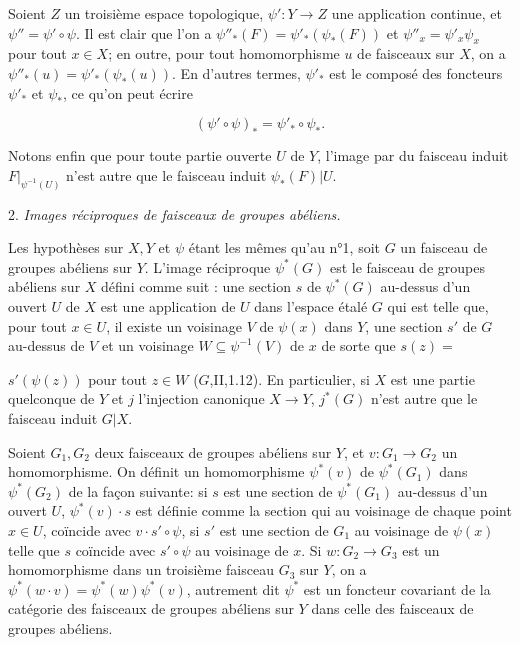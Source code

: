 Soient $Z$ un troisième espace topologique, $\psi' : Y \to Z$ une application continue, et $\psi'' = \psi' \circ \psi$. Il est clair que l'on a $\psi''_*(F) = \psi'_*(\psi_*(F))$ et $\psi''_x = \psi'_x \psi_x$ pour tout $x \in X$; en outre, pour tout homomorphisme $u$ de faisceaux sur $X$, on a $\psi''_*(u) = \psi'_*(\psi_*(u))$. En d'autres termes, $\psi'_*$ est le composé des foncteurs $\psi'_*$ et $\psi_*$, ce qu'on peut écrire

$$(\psi' \circ \psi)_* = \psi'_* \circ \psi_* .$$

Notons enfin que pour toute partie ouverte $U$ de $Y$, l'image par du faisceau induit $F|_{\psi^{-1}(U)}$ n'est autre que le faisceau induit $\psi_*(F)|U$.

2. \emph{Images réciproques de faisceaux de groupes abéliens.}

Les hypothèses sur $X, Y$ et $\psi$ étant les mêmes qu'au n°1, soit $G$ un faisceau de groupes abéliens sur $Y$. L'image réciproque $\psi^*(G)$ est le faisceau de groupes abéliens sur $X$ défini comme suit : une section $s$ de $\psi^*(G)$ au-dessus d'un ouvert $U$ de $X$ est une application de $U$ dans l'espace étalé $G$ qui est telle que, pour tout $x \in U$, il existe un voisinage $V$ de $\psi(x)$ dans $Y$, une section $s'$ de $G$ au-dessus de $V$ et un voisinage $W \subseteq \psi^{-1}(V)$ de $x$ de sorte que $s(z) =$

\newpage


$s'(\psi(z))$ pour tout $z \in W$ ($G$,II,1.12). En particulier, si $X$ est une partie
quelconque de $Y$ et $j$ l'injection canonique $X \to Y$, $j^*(G)$ n'est autre que le
faisceau induit $G|X$.

Soient $G_1, G_2$ deux faisceaux de groupes abéliens sur $Y$, et $v: G_1 \to G_2$ un
homomorphisme. On définit un homomorphisme $\psi^*(v)$ de $\psi^*(G_1)$ dans $\psi^*(G_2)$ de
la façon suivante: si $s$ est une section de $\psi^*(G_1)$ au-dessus d'un ouvert $U$,
$\psi^*(v) \cdot s$ est définie comme la section qui au voisinage de chaque point $x \in U$,
coïncide avec $v \cdot s' \circ \psi$, si $s'$ est une section de $G_1$ au voisinage de $\psi(x)$ telle
que $s$ coïncide avec $s' \circ \psi$ au voisinage de $x$. Si $w: G_2 \to G_3$ est un homomorphisme dans un troisième faisceau $G_3$ sur $Y$, on a $\psi^*(w \cdot v) = \psi^*(w) \psi^*(v)$, autrement dit $\psi^*$ est un foncteur covariant de la catégorie des faisceaux de groupes abéliens sur $Y$ dans celle des faisceaux de groupes abéliens.


